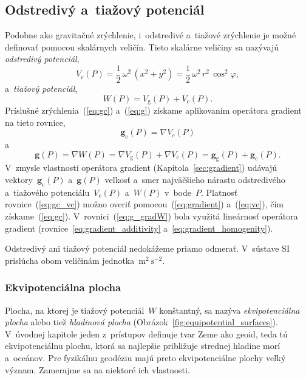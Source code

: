 \documentclass[a4paper, 12pt]{book}
\newcommand{\gidx}{\mathrm g}
\newcommand{\cidx}{\mathrm c}
\let\vec\mathbf
\begin{document}
\subsection{Odstredivý a~tiažový potenciál}
\label{sec:centrifugal_and_gravity_potential}

Podobne ako gravitačné zrýchlenie, i~odstredivé a~tiažové zrýchlenie je
možné definovať pomocou skalárnych veličín.  Tieto skalárne veličiny sa
nazývajú \emph{odstredivý potenciál},
%
\begin{equation}
\label{eq:vc}
V_c(P) = \frac{1}{2} \, \omega^2 \, (x^2 + y^2) = \frac{1}{2} \, \omega^2 \, 
r^2 \, \cos^2\varphi{,}
\end{equation}
%
a~\emph{tiažový potenciál},
%
\begin{equation}
\label{eq:w}
W(P) = V_\gidx(P) + V_\cidx(P){.}
\end{equation}
%
Príslušné zrýchlenia~(\ref{eq:gc}) a~(\ref{eq:g}) získame aplikovaním operátora
gradient na tieto rovnice,
%
\begin{equation}
\label{eq:gc_vc}
\vec g_\cidx(P) = \nabla V_c(P)
\end{equation}
%
a
%
\begin{equation}
\label{eq:g_gradW}
\vec g(P) = \nabla W(P) = \nabla V_\gidx(P) + \nabla V_\cidx(P) = \vec
g_\gidx(P) + \vec g_\cidx(P){.}
\end{equation}
%
V~zmysle vlastností operátora gradient (Kapitola~\ref{sec:gradient}) udávajú 
vektory~$\vec g_\cidx(P)$ a~$\vec g(P)$ veľkosť a~smer najväčšieho nárastu
odstredivého a~tiažového potenciálu~$V_\cidx(P)$ a~$W(P)$ v~bode~$P$.  Platnosť
rovnice~(\ref{eq:gc_vc}) možno overiť pomocou~(\ref{eq:gradient})
a~(\ref{eq:vc}), čím získame~(\ref{eq:gc}).  V~rovnici~(\ref{eq:g_gradW}) bola
využitá lineárnosť operátora gradient (rovnice~\ref{eq:gradient_additivity} 
a~\ref{eq:gradient_homogenity}).

Odstredivý ani tiažový potenciál nedokážeme priamo odmerať.  V~sústave SI 
prislúcha obom veličinám jednotka~$\mathrm{m}^2 \ \mathrm{s}^{-2}$.

\subsubsection{Ekvipotenciálna plocha}
\label{sec:equipotential_surface}

Plocha, na ktorej je tiažový potenciál~$W$ konštantný, sa nazýva 
\emph{ekvipotenciálna plocha} alebo tiež \emph{hladinová plocha} 
(Obrázok~\ref{fig:equipotential_surfaces}).  V~úvodnej kapitole jeden 
z~prístupov definuje tvar Zeme ako geoid, teda tú ekvipotenciálnu plochu, ktorá 
sa najlepšie približuje strednej hladine morí a~oceánov.  Pre fyzikálnu 
geodéziu majú preto ekvipotenciálne plochy veľký význam.  Zamerajme sa na 
niektoré ich vlastnosti.
\end{document}
